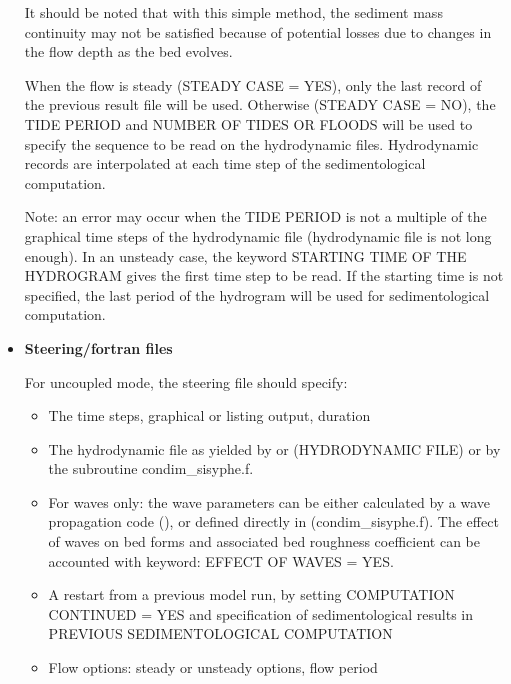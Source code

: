 \begin{itemize}
It should be noted that with this simple method, the sediment mass
continuity may not be satisfied because of potential losses due to changes
in the flow depth as the bed evolves. 

When the flow is steady ({\ttfamily STEADY CASE = YES}), only the last record of the previous result file will be
used. Otherwise ({\ttfamily STEADY CASE = NO}), the {\ttfamily TIDE PERIOD} and {\ttfamily NUMBER OF TIDES OR FLOODS} will be used to specify the sequence to be read on the
hydrodynamic files. Hydrodynamic records are interpolated at each time step
of the sedimentological computation.

Note: an error may occur when the {\ttfamily TIDE PERIOD} is not a multiple of the
graphical time steps of the hydrodynamic file ({\ttfamily hydrodynamic file is not
long enough}). In an unsteady case, the keyword {\ttfamily STARTING TIME OF THE HYDROGRAM} gives the
first time step to be read. If the starting time is not specified, the last
period of the hydrogram will be used for sedimentological computation.
\\

\item \textbf{Steering/fortran files}

For uncoupled mode, the \sisyphe steering file should specify:
\begin{itemize}
\item The time steps, graphical or listing output,
duration 
\item The hydrodynamic file as yielded by \teldd or \telddd ({\ttfamily HYDRODYNAMIC FILE}) or by the subroutine {\ttfamily condim\_sisyphe.f}. 
\item For waves only: the wave parameters can be either
calculated by a wave propagation code (\tomawac), or defined directly in
\sisyphe ({\ttfamily condim\_sisyphe.f}). The effect of waves on bed forms and associated
bed roughness coefficient can be accounted with keyword: {\ttfamily EFFECT OF WAVES = YES}.
\item A restart from a previous \sisyphe model run, by
setting {\ttfamily COMPUTATION CONTINUED = YES} and specification of sedimentological
results in {\ttfamily PREVIOUS SEDIMENTOLOGICAL COMPUTATION}
\item Flow options: steady or unsteady options, flow
period
\end{itemize}


\end{itemize}
